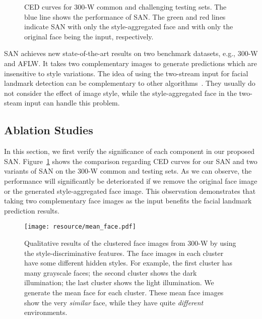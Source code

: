 \documentclass[10pt,twocolumn,letterpaper]{article}
\begin{document}
\begin{figure}[t]
\center
{}
\caption{CED curves for 300-W common and challenging testing sets.
The blue line shows the performance of SAN.
The green and red lines indicate SAN with only the style-aggregated face and with only the original face being the input, respectively.
}
\label{fig:pck_curve}
\end{figure}

SAN achieves new state-of-the-art results on two benchmark datasets, e.g., 300-W and AFLW.
It takes two complementary images to generate predictions which are insensitive to style variations.
The idea of using the two-stream input for facial landmark detection can be complementary to other algorithms~\cite{jourabloo2017pose,lv2017deep,xiao2017recurrent,zhu2016unconstrained}.
They usually do not consider the effect of image style, while the style-aggregated face in the two-steam input can handle this problem.



\subsection{Ablation Studies}\label{sec:ablation}

In this section, we first verify the significance of each component in our proposed SAN.
Figure~\ref{fig:pck_curve} shows the comparison regarding CED curves for our SAN and two variants of SAN on the 300-W common and testing sets.
As we can observe, the performance will significantly be deteriorated if we remove the original face image or the generated style-aggregated face image.
This observation demonstrates that taking two complementary face images as the input benefits the facial landmark prediction results.


\begin{figure}[t]
\center
\texttt{[image: resource/mean\_face.pdf]}
\caption{
Qualitative results of the clustered face images from 300-W by using the style-discriminative features.
The face images in each cluster have some different hidden styles.
For example, the first cluster has many grayscale faces; the second cluster shows the dark illumination; the last cluster shows the light illumination.
We generate the mean face for each cluster.
These mean face images show the very \textit{similar} face, while they have quite \textit{different} environments.
}
\vspace{-2mm}
\label{fig:mean-face}
\end{figure}
\end{document}
